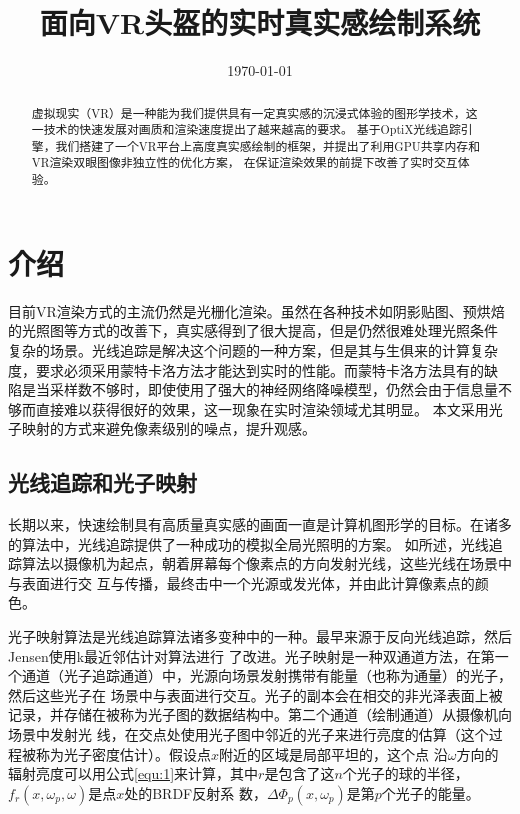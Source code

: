 \documentclass[UTF8]{ctexart}
\title{面向VR头盔的实时真实感绘制系统}
\author{}
\date{\today}
\begin{document}
\maketitle
\begin{abstract}
    虚拟现实（VR）是一种能为我们提供具有一定真实感的沉浸式体验的图形学技术，这一技术的快速发展对画质和渲染速度提出了越来越高的要求。
    基于OptiX光线追踪引擎，我们搭建了一个VR平台上高度真实感绘制的框架，并提出了利用GPU共享内存和VR渲染双眼图像非独立性的优化方案，
    在保证渲染效果的前提下改善了实时交互体验。
\end{abstract}

\section{介绍}
    目前VR渲染方式的主流仍然是光栅化渲染。虽然在各种技术如阴影贴图、预烘焙的光照图等方式的改善下，真实感得到了很大提高，但是仍然很难处理光照条件
    复杂的场景。光线追踪是解决这个问题的一种方案，但是其与生俱来的计算复杂度，要求必须采用蒙特卡洛方法才能达到实时的性能。而蒙特卡洛方法具有的缺
    陷是当采样数不够时，即使使用了强大的神经网络降噪模型，仍然会由于信息量不够而直接难以获得很好的效果，这一现象在实时渲染领域尤其明显。
    本文采用光子映射的方式来避免像素级别的噪点，提升观感。
    \subsection{光线追踪和光子映射}
        长期以来，快速绘制具有高质量真实感的画面一直是计算机图形学的目标。在诸多的算法中，光线追踪提供了一种成功的模拟全局光照明的方案。
        如\cite{GlobalIllumination}所述，光线追踪算法以摄像机为起点，朝着屏幕每个像素点的方向发射光线，这些光线在场景中与表面进行交
        互与传播，最终击中一个光源或发光体，并由此计算像素点的颜色。
        
        光子映射算法是光线追踪算法诸多变种中的一种。最早来源于反向光线追踪\cite{ARVO1986Backward}，然后Jensen使用k最近邻估计对算法进行
        了改进\cite{Jensen1996Global}。光子映射是一种双通道方法，在第一个通道（光子追踪通道）中，光源向场景发射携带有能量（也称为通量）的光子，然后这些光子在
        场景中与表面进行交互。光子的副本会在相交的非光泽表面上被记录，并存储在被称为光子图的数据结构中。第二个通道（绘制通道）从摄像机向场景中发射光
        线，在交点处使用光子图中邻近的光子来进行亮度的估算（这个过程被称为光子密度估计）。假设点$x$附近的区域是局部平坦的，这个点
        沿$\omega$方向的辐射亮度可以用公式\ref{equ:1}来计算，其中$r$是包含了这$n$个光子的球的半径，$f_r(x,\omega_p,\omega)$是点$x$处的BRDF反射系
        数，$\Delta\Phi_p(x,\omega_p)$是第$p$个光子的能量。
        
\end{document}
